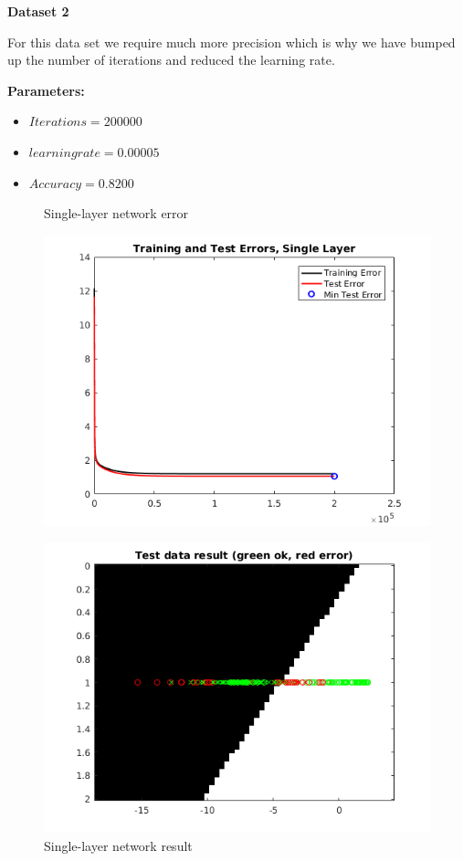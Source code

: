 \documentclass[a4paper,12pt]{article}
\begin{document}
\noindent \textbf{Dataset 2}

For this data set we require much more precision which is why we have bumped up the number of iterations and reduced the learning rate.

\textbf{Parameters:}
\begin{itemize}
\item $Iterations = 200000$
\item $learning rate = 0.00005$
\item $Accuracy = 0.8200$
\end{itemize}

\begin{figure}[H]
\centering
  \begin{minipage}[]{0.49\textwidth}
  \caption{Single-layer network error}\label{fig:single_2_error}
  \includegraphics[width=\textwidth]{figures/single_2_error.png}
  \end{minipage}
  \begin{minipage}[]{0.49\textwidth}
  \caption{Single-layer network result}\label{fig:single_2_test}
  \includegraphics[width=\textwidth]{figures/single_2_test.png}
  \end{minipage}
\end{figure}
\end{document}
